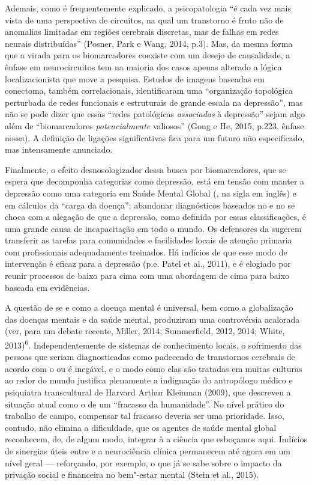 Ademais, como é frequentemente explicado, a psicopatologia ``é cada vez
mais vista de uma perspectiva de circuitos, na qual um transtorno é
fruto não de anomalias limitadas em regiões cerebrais discretas, mas de
falhas em redes neurais distribuídas'' (Posner, Park e Wang, 2014, p.3).
Mas, da mesma forma que a virada para os biomarcadores coexiste com um
desejo de causalidade, a ênfase em neurocircuitos tem na maioria dos
casos apenas alterado a lógica localizacionista que move a pesquisa.
Estudos de imagens baseadas em conectoma, também correlacionais,
identificaram uma ``organização topológica perturbada de redes
funcionais e estruturais de grande escala na depressão'', mas não se
pode dizer que essas ``redes patológicas \emph{associadas} à depressão''
sejam algo além de ``biomarcadores \emph{potencialmente} valiosos''
(Gong e He, 2015, p.223, ênfase nossa). A definição de ligações
significativas fica para um futuro não especificado, mas intensamente
anunciado.

Finalmente, o efeito desnosologizador dessa busca por biomarcadores, que
se espera que decomponha categorias como depressão, está em tensão com
manter a depressão como uma categoria em Saúde Mental Global (, na
sigla em inglês) e em cálculos da ``carga da doença''; abandonar
diagnósticos baseados no \emph{} e no \emph{} se choca com a
alegação de que a depressão, como definida por essas classificações, é
uma grande causa de incapacitação em todo o mundo. Os defensores da 
sugerem transferir as tarefas para comunidades e facilidades locais de
atenção primaria com profissionais adequadamente treinados. Há indícios
de que esse modo de intervenção é eficaz para a depressão (p.e. Patel et
al., 2011), e é elogiado por reunir processos de baixo para cima com uma
abordagem de cima para baixo baseada em evidências.

A questão de se e como a doença mental é universal, bem como a
globalização das doenças mentais e da saúde mental, produziram uma
controvérsia acalorada (ver, para um debate recente, Miller, 2014;
Summerfield, 2012, 2014; White, 2013)\textsuperscript{6}.
Independentemente de sistemas de conhecimento locais, o sofrimento das
pessoas que seriam diagnosticadas como padecendo de transtornos
cerebrais de acordo com o \emph{} ou \emph{} é inegável, e o modo
como elas são tratadas em muitas culturas ao redor do mundo justifica
plenamente a indignação do antropólogo médico e psiquiatra transcultural
de Harvard Arthur Kleinman (2009), que descreveu a situação atual como o
de um ``fracasso da humanidade''. No nível prático do trabalho de campo,
compensar tal fracasso deveria ser uma prioridade. Isso, contudo, não
elimina a dificuldade, que os agentes de saúde mental global reconhecem,
de, de algum modo, integrar à  a ciência que esboçamos aqui. Indícios
de sinergias úteis entre  e a neurociência clínica permanecem até
agora em um nível geral --- reforçando, por exemplo, o que já se sabe
sobre o impacto da privação social e financeira no bem"-estar mental
(Stein et al., 2015).


